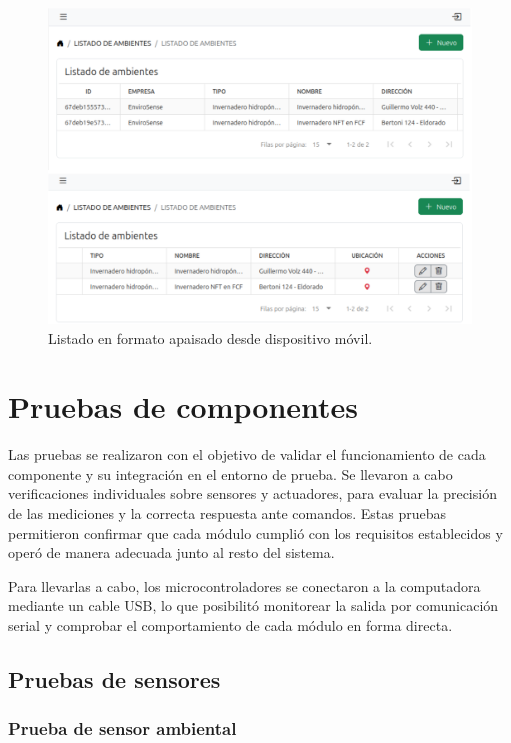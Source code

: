 \begin{figure}[H]
    \centering
    \includegraphics[width=\textwidth]{Images/50_responsive.png}
    \caption[Listado en formato apaisado desde dispositivo móvil]{Listado en formato apaisado desde dispositivo móvil.}
    \label{fig:responsive2}
\end{figure}

\section{Pruebas de componentes}

Las pruebas se realizaron con el objetivo de validar el funcionamiento de cada
componente y su integración en el entorno de prueba. Se llevaron a cabo
verificaciones individuales sobre sensores y actuadores, para evaluar la
precisión de las mediciones y la correcta respuesta ante comandos. Estas
pruebas permitieron confirmar que cada módulo cumplió con los requisitos
establecidos y operó de manera adecuada junto al resto del sistema.

Para llevarlas a cabo, los microcontroladores se conectaron a la computadora
mediante un cable USB, lo que posibilitó monitorear la salida por comunicación
serial y comprobar el comportamiento de cada módulo en forma directa.

\subsection{Pruebas de sensores}

\subsubsection{Prueba de sensor ambiental}

